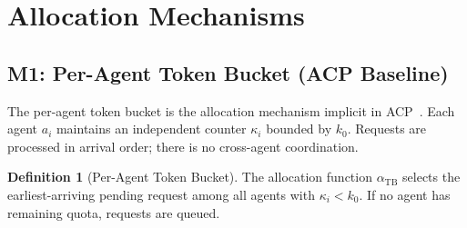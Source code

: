\documentclass[11pt]{article}
\theoremstyle{plain}
\theoremstyle{definition}
\newtheorem{definition}[theorem]{Definition}
\theoremstyle{remark}
\newcommand{\kbound}{k_0}                  %
\newcommand{\alloc}{\alpha}                %
\begin{document}
\section{Allocation Mechanisms}
\label{sec:mechanisms}

%
%
%
%
%
%
%

\subsection{M1: Per-Agent Token Bucket (ACP Baseline)}
\label{sec:m1}

The per-agent token bucket is the allocation mechanism implicit in
ACP~\citep{fernandez2026b}.  Each agent $a_i$ maintains an independent
counter $\kappa_i$ bounded by $\kbound$.  Requests are processed in
arrival order; there is no cross-agent coordination.

\begin{definition}[Per-Agent Token Bucket]
\label{def:m1}
The allocation function $\alloc_{\mathrm{TB}}$ selects the
earliest-arriving pending request among all agents with $\kappa_i <
\kbound$.  If no agent has remaining quota, requests are queued.
\end{definition}
\end{document}
